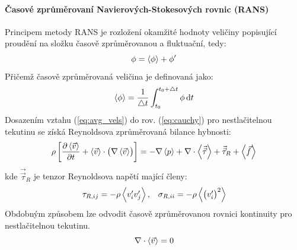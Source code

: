 \paragraph{Časové zprůměrovaní Navierových-Stokesových rovnic  (RANS)}
Principem metody RANS je rozložení okamžité hodnoty veličiny popisující proudění na složku časově zprůměrovanou a fluktuační, tedy:
\begin{equation}
  \phi = \left< \phi \right> + \phi'
  \label{eq:avg_vels}
\end{equation}
Přičemž časově zprůměrovaná veličina je definovaná jako:
\begin{equation}
  \left< \phi \right>  = \frac{1}{\bigtriangleup t} \int_{t_{0}}^{t_{0} + \bigtriangleup t} \phi\,\mathrm{d}t
  \label{eq:phi_avg}
\end{equation}
Dosazením vztahu (\ref{eq:avg_vels}) do rov. (\ref{eq:cauchy}) pro nestlačitelnou tekutinu se získá Reynoldsova zprůměrovaná bilance hybnosti:  
\begin{equation}
    \rho \left[ \frac{\partial \left< \vec{v} \right>}{\partial t} + \left< \vec{v} \right> \cdot \left( \nabla  \left< \vec{v} \right> \right) \right] = -\nabla \left< p \right> +  \nabla \cdot \left< \vec{\vec{\tau}} \right> + \vec{\vec{\tau}}_{R} + \left< \vec{f} \right>
  	\label{eq:cauchy_avg}
\end{equation} 
kde $\vec{\vec{\tau}}_{R}$ je tenzor Reynoldsova napětí mající členy: 
\begin{equation}
    \begin{array}{cc}
      \tau_{R,ij} = -\rho\left< v_{i}'v_{j}' \right>, & \sigma_{R,ii} = -\rho\left< \left(v_{i}'\right)^{2} \right>
      \end{array}
      \label{eq:rey_stress}
\end{equation}
Obdobným způsobem lze odvodit časově zprůměrovanou rovnici kontinuity pro nestlačitelnou tekutinu.
\begin{equation}
	\nabla \cdot \left< \vec{v} \right> = 0
	\label{eq:conti1simp_avg}
\end{equation}  

